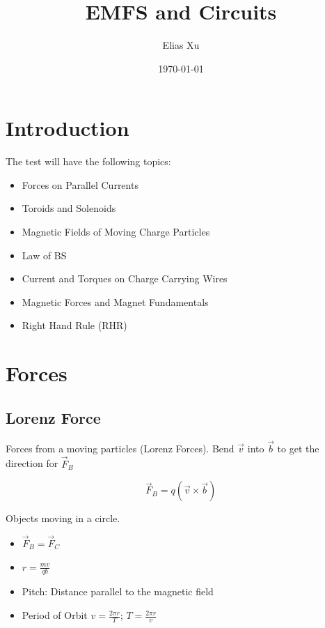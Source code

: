 \documentclass{article}
\begin{document}
\title{EMFS and Circuits}
\author{Elias Xu}
\date{\today}
\maketitle
\setlength{\parindent}{0pt}

\tableofcontents

\section{Introduction}

The test will have the following topics:

\begin{itemize}
    \item Forces on Parallel Currents
    \item Toroids and Solenoids
    \item Magnetic Fields of Moving Charge Particles
    \item Law of BS
    \item Current and Torques on Charge Carrying Wires
    \item Magnetic Forces and Magnet Fundamentals
    \item Right Hand Rule (RHR)
\end{itemize}

\section{Forces} 

\subsection{Lorenz Force}

Forces from a moving particles (Lorenz Forces). Bend $\vec{v}$ into $\vec{b}$ to get the direction for $\vec{F}_B$ 

\[\vec{F}_B = q(\vec{v} \times \vec{b})\]

Objects moving in a circle. 

\begin{itemize}
    \item $\vec{F}_B = \vec{F}_C$
    \item $r = \frac{mv}{qb}$
    \item Pitch: Distance parallel to the magnetic field
    \item Period of Orbit $v = \frac{2\pi r}{T}$; $T = \frac{2 \pi r}{v}$
\end{itemize}
\end{document}
